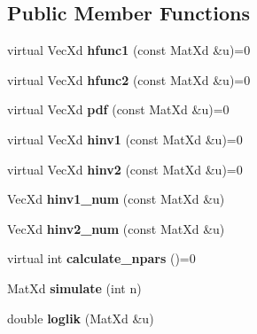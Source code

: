 \subsection*{Public Member Functions}
\begin{DoxyCompactItemize}
\item 
\hypertarget{group__hfunctions_gae44649cf8ce52f9401ab1dcda8630696}{virtual Vec\+Xd {\bfseries hfunc1} (const Mat\+Xd \&u)=0}\label{group__hfunctions_gae44649cf8ce52f9401ab1dcda8630696}

\item 
\hypertarget{group__hfunctions_ga37d5edc7b3ced924b82849158374adb5}{virtual Vec\+Xd {\bfseries hfunc2} (const Mat\+Xd \&u)=0}\label{group__hfunctions_ga37d5edc7b3ced924b82849158374adb5}

\item 
\hypertarget{class_bicop_afec5abe444ca1693d444079f4666a38f}{virtual Vec\+Xd {\bfseries pdf} (const Mat\+Xd \&u)=0}\label{class_bicop_afec5abe444ca1693d444079f4666a38f}

\item 
\hypertarget{class_bicop_a187e104d4282be91a031010331fdeb3d}{virtual Vec\+Xd {\bfseries hinv1} (const Mat\+Xd \&u)=0}\label{class_bicop_a187e104d4282be91a031010331fdeb3d}

\item 
\hypertarget{class_bicop_a04db4f321e611405055eb391129b2c79}{virtual Vec\+Xd {\bfseries hinv2} (const Mat\+Xd \&u)=0}\label{class_bicop_a04db4f321e611405055eb391129b2c79}

\item 
\hypertarget{class_bicop_abd517becaa97834eac56b0d1a0c7a666}{Vec\+Xd {\bfseries hinv1\+\_\+num} (const Mat\+Xd \&u)}\label{class_bicop_abd517becaa97834eac56b0d1a0c7a666}

\item 
\hypertarget{class_bicop_a2b262e9e2adee0c215da47467f1dec45}{Vec\+Xd {\bfseries hinv2\+\_\+num} (const Mat\+Xd \&u)}\label{class_bicop_a2b262e9e2adee0c215da47467f1dec45}

\item 
\hypertarget{class_bicop_a6c2b1e5e368f4339bd6acac2f32da74e}{virtual int {\bfseries calculate\+\_\+npars} ()=0}\label{class_bicop_a6c2b1e5e368f4339bd6acac2f32da74e}

\item 
\hypertarget{class_bicop_ad7803642785aa7027771b02813cf4ec8}{Mat\+Xd {\bfseries simulate} (int n)}\label{class_bicop_ad7803642785aa7027771b02813cf4ec8}

\item 
\hypertarget{class_bicop_a19ae3dfb5696ecae400f00e04e697f17}{double {\bfseries loglik} (Mat\+Xd \&u)}\label{class_bicop_a19ae3dfb5696ecae400f00e04e697f17}


\end{DoxyCompactItemize}
